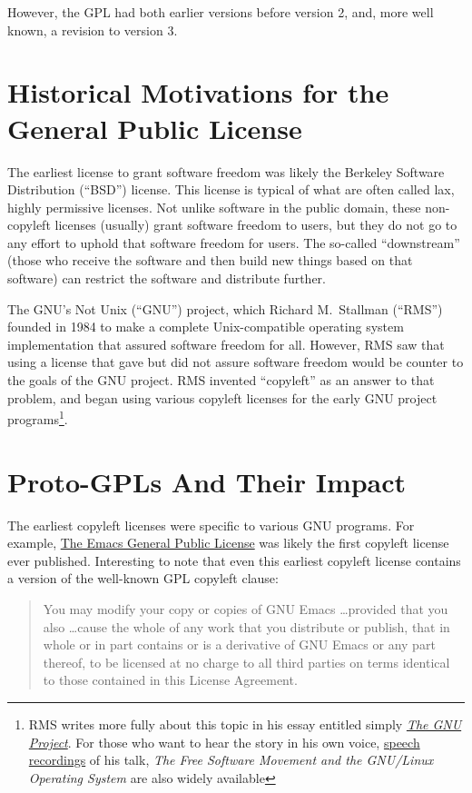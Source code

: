 However, the GPL had both earlier versions before version 2, and, more well
known, a revision to version 3. 

\section{Historical Motivations for the General Public License}

The earliest license to grant software freedom was likely the Berkeley
Software Distribution (``BSD'') license.  This license is typical of what are
often called lax, highly permissive licenses.  Not unlike software in the
public domain, these non-copyleft licenses (usually) grant software freedom
to users, but they do not go to any effort to uphold that software freedom
for users.  The so-called ``downstream'' (those who receive the software and
then build new things based on that software) can restrict the software and
distribute further.

The GNU's Not Unix (``GNU'') project, which Richard M.~Stallman (``RMS'')
founded in 1984 to make a complete Unix-compatible operating system
implementation that assured software freedom for all.  However, RMS saw that
using a license that gave but did not assure software freedom would be
counter to the goals of the GNU project.  RMS invented ``copyleft'' as an
answer to that problem, and began using various copyleft licenses for the
early GNU project programs\footnote{RMS writes more fully about this topic in
  his essay entitled simply
  \href{http://www.gnu.org/gnu/thegnuproject.html}{\textit{The GNU Project}}.
    For those who want to hear the story in his own voice,
    \href{http://audio-video.gnu.org/audio/}{speech recordings} of his talk,
    \textit{The Free Software Movement and the GNU/Linux Operating System}
    are also widely available}.

\section{Proto-GPLs And Their Impact}

The earliest copyleft licenses were specific to various GNU programs.  For
example, \href{http://www.free-soft.org/gpl_history/emacs_gpl.html}{The Emacs
  General Public License} was likely the first copyleft license ever
published.  Interesting to note that even this earliest copyleft license
contains a version of the well-known GPL copyleft clause:

\begin{quotation}
You may modify your copy or copies of GNU Emacs \ldots provided that you also
\ldots cause the whole of any work that you distribute or publish, that in
whole or in part contains or is a derivative of GNU Emacs or any part
thereof, to be licensed at no charge to all third parties on terms identical
to those contained in this License Agreement.
\end{quotation}

